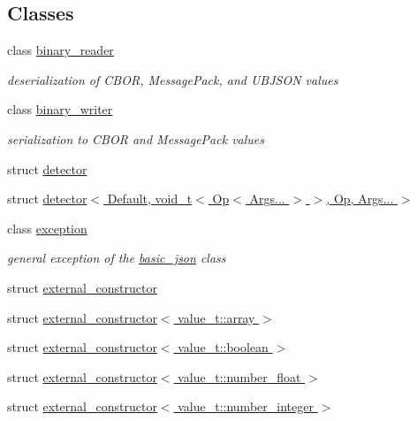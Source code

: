 \subsection*{Classes}
\begin{DoxyCompactItemize}
\item 
class \hyperlink{classnlohmann_1_1detail_1_1binary__reader}{binary\+\_\+reader}
\begin{DoxyCompactList}\small\item\em deserialization of C\+B\+OR, Message\+Pack, and U\+B\+J\+S\+ON values \end{DoxyCompactList}\item 
class \hyperlink{classnlohmann_1_1detail_1_1binary__writer}{binary\+\_\+writer}
\begin{DoxyCompactList}\small\item\em serialization to C\+B\+OR and Message\+Pack values \end{DoxyCompactList}\item 
struct \hyperlink{structnlohmann_1_1detail_1_1detector}{detector}
\item 
struct \hyperlink{structnlohmann_1_1detail_1_1detector_3_01Default_00_01void__t_3_01Op_3_01Args_8_8_8_01_4_01_4_00_01Op_00_01Args_8_8_8_01_4}{detector$<$ Default, void\+\_\+t$<$ Op$<$ Args... $>$ $>$, Op, Args... $>$}
\item 
class \hyperlink{classnlohmann_1_1detail_1_1exception}{exception}
\begin{DoxyCompactList}\small\item\em general exception of the \hyperlink{classnlohmann_1_1basic__json}{basic\+\_\+json} class \end{DoxyCompactList}\item 
struct \hyperlink{structnlohmann_1_1detail_1_1external__constructor}{external\+\_\+constructor}
\item 
struct \hyperlink{structnlohmann_1_1detail_1_1external__constructor_3_01value__t_1_1array_01_4}{external\+\_\+constructor$<$ value\+\_\+t\+::array $>$}
\item 
struct \hyperlink{structnlohmann_1_1detail_1_1external__constructor_3_01value__t_1_1boolean_01_4}{external\+\_\+constructor$<$ value\+\_\+t\+::boolean $>$}
\item 
struct \hyperlink{structnlohmann_1_1detail_1_1external__constructor_3_01value__t_1_1number__float_01_4}{external\+\_\+constructor$<$ value\+\_\+t\+::number\+\_\+float $>$}
\item 
struct \hyperlink{structnlohmann_1_1detail_1_1external__constructor_3_01value__t_1_1number__integer_01_4}{external\+\_\+constructor$<$ value\+\_\+t\+::number\+\_\+integer $>$}

\end{DoxyCompactItemize}

